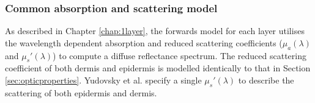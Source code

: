\subsubsection{Common absorption and scattering model}\label{sec:opticproperties2}
As described in Chapter \ref{chap:1layer}, the forwards model for each layer utilises the wavelength dependent absorption and reduced scattering coefficients ($\mu_a(\lambda)$ and $\mu_s'(\lambda)$) to compute a diffuse reflectance spectrum. The reduced scattering coefficient of both dermis and epidermis is modelled identically to that in Section \ref{sec:opticproperties}.
Yudovsky et al. specify a single $\mu_s'(\lambda)$ to describe the scattering of both epidermis and dermis. 

